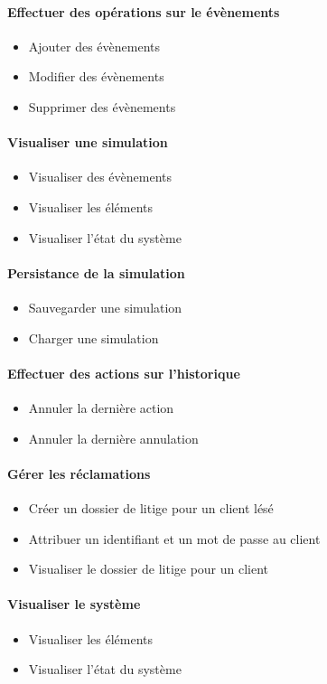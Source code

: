 {\paragraph{Effectuer des opérations sur le évènements}
\begin{itemize}
	\item Ajouter des évènements
	\item Modifier des évènements
	\item Supprimer des évènements
\end{itemize}

\paragraph{Visualiser une simulation}
\begin{itemize}
	\item Visualiser des évènements
	\item Visualiser les éléments
	\item Visualiser l'état du système
\end{itemize}

\paragraph{Persistance de la simulation}
\begin{itemize}
	\item Sauvegarder une simulation
	\item Charger une simulation
\end{itemize}

\paragraph{Effectuer des actions sur l'historique}
\begin{itemize}
	\item Annuler la dernière action
	\item Annuler la dernière annulation
\end{itemize}

\paragraph{Gérer les réclamations}
\begin{itemize}
	\item Créer un dossier de litige pour un client lésé
	\item Attribuer un identifiant et un mot de passe au client
	\item Visualiser le dossier de litige pour un client
\end{itemize}

\paragraph{Visualiser le système}
\begin{itemize}
	\item Visualiser les éléments
	\item Visualiser l'état du système
\end{itemize}

}

